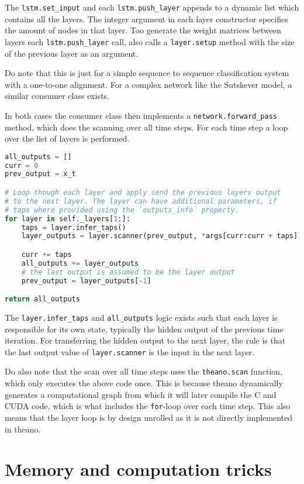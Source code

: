 The \texttt{lstm.set\_input} and each \texttt{lstm.push\_layer} appends to a dynamic list which contains all the layers. The integer argument in each layer constructor specifies the amount of nodes in that layer. Too generate the weight matrices between layers each \texttt{lstm.push\_layer} call, also calls a \texttt{layer.setup} method with the size of the previous layer as an argument.

Do note that this is just for a simple sequence to sequence classification system with a one-to-one alignment. For a complex network like the Sutskever model, a similar consumer class exists.

In both cases the consumer class then implements a \texttt{network.forward\_pass} method, which does the scanning over all time steps. For each time step a loop over the list of layers is performed.
\begin{lstlisting}[language=Python]
all_outputs = []
curr = 0
prev_output = x_t

# Loop though each layer and apply send the previous layers output
# to the next layer. The layer can have additional parameters, if
# taps where provided using the `outputs_info` property.
for layer in self._layers[1:]:
    taps = layer.infer_taps()
    layer_outputs = layer.scanner(prev_output, *args[curr:curr + taps])

    curr += taps
    all_outputs += layer_outputs
    # the last output is assumed to be the layer output
    prev_output = layer_outputs[-1]

return all_outputs
\end{lstlisting}

The \texttt{layer.infer\_taps} and \texttt{all\_outputs} logic exists such that each layer is responsible for its own state, typically the hidden output of the previous time iteration. For transferring the hidden output to the next layer, the rule is that the last output value of \texttt{layer.scanner} is the input in the next layer.

Do also note that the scan over all time steps uses the \texttt{theano.scan} function, which only executes the above code once. This is because theano dynamically generates a computational graph from which it will later compile the C and CUDA code, which is what includes the \texttt{for}-loop over each time step. This also means that the layer loop is by design unrolled as it is not directly implemented in theano.

\section{Memory and computation tricks}

